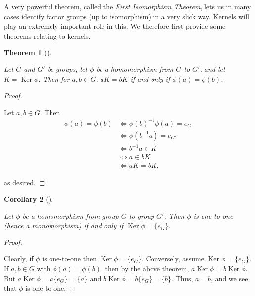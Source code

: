 \documentclass[10pt,]{book}
\theoremstyle{plain}
\newtheorem{theorem}{Theorem}[section]
\newtheorem{corollary}[theorem]{Corollary}
\theoremstyle{definition}
\theoremstyle{definition}
\theoremstyle{definition}
\theoremstyle{definition}
\numberwithin{equation}{section}
\DeclareMathOperator{\Ker}{Ker}
\newcommand{\amp}{ & }
\begin{document}
    A very powerful theorem, called the \emph{First Isomorphism
    Theorem}, lets us in many cases identify factor groups (up to
    isomorphism) in a very slick way. Kernels will play an extremely
    important role in this. We
    therefore first provide some theorems relating to kernels.
\begin{theorem}[{}]\label{kermean}

        Let \(G\) and \(G'\) be groups, let \(\phi\) be a
        homomorphism from \(G\) to \(G'\), and let \(K=\Ker \phi\). Then for
        \(a,b\in G\), \(aK=bK\) if and only if \(\phi(a)=\phi(b)\).
\end{theorem}
\begin{proof}\hypertarget{proof-49}{}

      Let \(a,b\in G\). Then
\begin{align*}
\phi(a)=\phi(b)\amp \Leftrightarrow
        \phi(b)^{-1}\phi(a)=e_{G'}\\
\amp \Leftrightarrow \phi(b^{-1}a)=e_{G'}\\
\amp \Leftrightarrow b^{-1}a\in K\\
\amp \Leftrightarrow a \in bK\\
\amp \Leftrightarrow aK=bK,
\end{align*}

      as desired.
\end{proof}
\begin{corollary}[{}]\label{kerone}

        Let \(\phi\) be a homomorphism from group \(G\) to group
        \(G'\). Then \(\phi\) is one-to-one (hence a monomorphism) if and only
        if \(\Ker \phi=\{e_G\}\).
\end{corollary}
\begin{proof}\hypertarget{proof-50}{}

      Clearly, if \(\phi\) is one-to-one then \(\Ker \phi=\{e_G\}\).
      Conversely, assume \(\Ker \phi=\{e_G\}\). If \(a,b\in G\) with
      \(\phi(a)=\phi(b)\), then by the above theorem, \(a\Ker \phi=b\Ker
      \phi\). But \(a\Ker \phi=a\{e_G\}=\{a\}\) and \(b\Ker
      \phi=b\{e_G\}=\{b\}\). Thus, \(a=b\), and we see that \(\phi\) is
      one-to-one.
\end{proof}
\par
\end{document}
